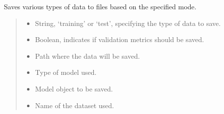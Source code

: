\documentclass[letterpaper,10pt,english]{sphinxmanual}
\begin{document}
\begin{fulllineitems}
\label{\detokenize{docs/utilities:utilities.save_data}}
\pysigstartsignatures
{}
\pysigstopsignatures
\sphinxAtStartPar
Saves various types of data to files based on the specified mode.
\begin{quote}\begin{description}
\begin{itemize}
\item {} 
\sphinxAtStartPar
{} \textendash{} String, ‘training’ or ‘test’, specifying the type of data to save.

\item {} 
\sphinxAtStartPar
{} \textendash{} Boolean, indicates if validation metrics should be saved.

\item {} 
\sphinxAtStartPar
{} \textendash{} Path where the data will be saved.

\item {} 
\sphinxAtStartPar
{} \textendash{} Type of model used.

\item {} 
\sphinxAtStartPar
{} \textendash{} Model object to be saved.

\item {} 
\sphinxAtStartPar
{} \textendash{} Name of the dataset used.


\end{itemize}
\end{description}
\end{quote}
\end{fulllineitems}
\end{document}
